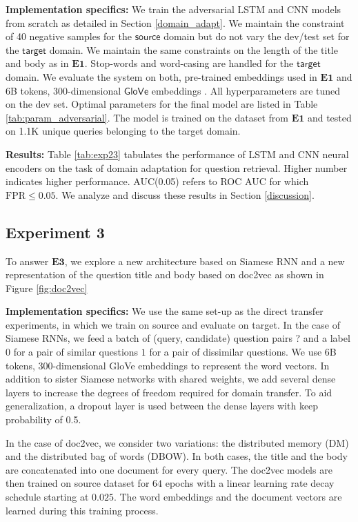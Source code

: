 \documentclass{sigkddExp}
\begin{document}
\textbf{Implementation specifics:} We train the adversarial LSTM and CNN models from scratch as detailed in Section \ref{domain_adapt}. We maintain the constraint of 40 negative samples for the $\mathsf{source}$ domain but do not vary the dev/test set for the $\mathsf{target}$ domain. We maintain the same constraints on the length of the title and body as in $\mathbf{E1}$. Stop-words and word-casing are handled for the $\mathsf{target}$ domain. We evaluate the system on both, pre-trained embeddings used in $\mathbf{E1}$ and 6B tokens, 300-dimensional $\mathsf{GloVe}$ embeddings \cite{pennington2014glove}. All hyperparameters are tuned on the dev set. Optimal parameters for the final model are listed in Table \ref{tab:param_adversarial}. The model is trained on the dataset from $\mathbf{E1}$ and tested on 1.1K unique queries belonging to the \textsf{target} domain.

\textbf{Results:} Table \ref{tab:exp23} tabulates the performance of LSTM and CNN neural encoders on the task of domain adaptation for question retrieval. Higher number indicates higher performance. AUC(0.05) refers to ROC AUC for which $\mathrm{FPR} \leq 0.05$. We analyze and discuss these results in Section \ref{discussion}.

\subsection{Experiment 3}
To answer $\mathbf{E3}$, we explore a new architecture based on Siamese RNN and a new representation of the question title and body based on \textsf{doc2vec} as shown in Figure \ref{fig:doc2vec}

\textbf{Implementation specifics:} We use the same set-up as the direct transfer experiments, in which we train on \textsf{source} and evaluate on \textsf{target}. In the case of Siamese RNNs, we feed a batch of {\color{red}(query, candidate) question pairs ?} and a label $0$ for a pair of similar questions $1$ for a pair of dissimilar questions. We use 6B tokens, 300-dimensional \textsf{GloVe} embeddings to represent the word vectors. In addition to sister Siamese networks with shared weights, we add several dense layers to increase the degrees of freedom required for domain transfer. To aid generalization, a dropout layer is used between the dense layers with keep probability of 0.5.

In the case of \textsf{doc2vec}, we consider two variations: the distributed memory (DM) and the distributed bag of words (DBOW). In both cases, the title and the body are concatenated into one document for every query. The doc2vec models are then trained on \textsf{source} dataset for $64$ epochs with a linear learning rate decay schedule starting at $0.025$. The word embeddings and the document vectors are learned during this training process.
\end{document}
